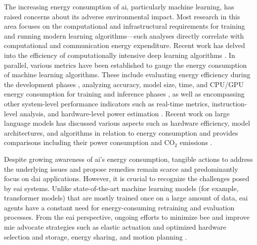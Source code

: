 \documentclass[12pt]{article}
\begin{document}
The increasing energy consumption of \ac{ai}, particularly machine learning, has raised concerns about its adverse environmental impact. Most research in this area focuses on the computational and infrastructural requirements for training and running modern learning algorithms---such analyses directly correlate with computational and communication energy expenditure. Recent work has delved into the efficiency of computationally intensive deep learning algorithms \cite{Schwartz2019GreenAI,Vinuesa2020roleartificialintelligence,Strubell2019EnergyPolicyConsiderations,Luccioni2023EstimatingCarbonFootprint}. In parallel, various metrics have been established to gauge the energy consumption of machine learning algorithms. These include evaluating energy efficiency during the development phases \cite{Zhou2020HULKEnergyEfficiency}, analyzing accuracy, model size, time, and CPU/GPU energy consumption for training and inference phases \cite{Dalgren2019GreenMLmethodology}, as well as encompassing other system-level performance indicators such as real-time metrics, instruction-level analysis, and hardware-level power estimation \cite{GarciaMartin2019Estimationenergyconsumption}. Recent work on large language models has discussed various aspects such as hardware efficiency, model architectures, and algorithms in relation to energy consumption \cite{Vries2023growingenergyfootprint} and provides comparisons including their power consumption and CO$_2$ emissions \cite{SIHCAI2023ArtificialIntelligenceIndex}.

Despite growing awareness of \ac{ai}'s energy consumption, tangible actions to address the underlying issues and propose remedies remain scarce and predominantly focus on \ac{dai} applications. However, it is crucial to recognize the challenges posed by \ac{eai} systems. Unlike state-of-the-art machine learning models (for example, transformer models) that are mostly trained once on a large amount of data, \ac{eai} agents have a constant need for energy-consuming retraining and evaluation processes. From the \ac{eai} perspective, ongoing efforts to minimize \ac{bee} and improve \ac{mie} advocate strategies such as elastic actuation and optimized hardware selection and storage, energy sharing, and motion planning \cite{CUT2015Smoothrobotmovements, Mohammed2014MinimizingEnergyConsumption, Chemnitz2011Analyzingenergyconsumption,Vasarhelyi2023OverviewEnergiesProblems,Sekala2024SelectedIssuesMethods}.
\end{document}
